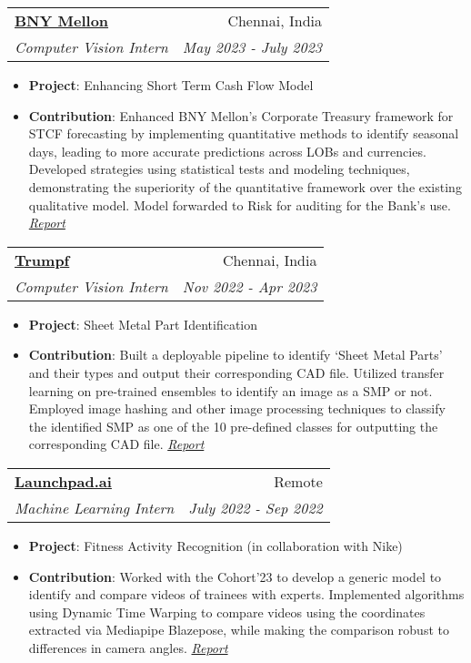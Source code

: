 \documentclass[a4paper,20pt]{article}
\makeatletter
\newcommand{\resumeItem}[2]{
  \item\small{
    \textbf{#1}{: #2 \vspace{-2pt}}
  }
}
\newcommand{\resumeSubheading}[4]{
  \vspace{-1pt}\item
    \begin{tabular*}{0.97\textwidth}{l@{\extracolsep{\fill}}r}
      \textbf{#1} & #2 \\
      \textit{#3} & \textit{#4} \\
    \end{tabular*}\vspace{-5pt}
}
\newcommand{\resumeItemListStart}{\begin{itemize}}
\newcommand{\resumeItemListEnd}{\end{itemize}\vspace{-5pt}}
\makeatother
\begin{document}
\begin{comment}
    \resumeSubheading{Google Summer of Code - Submitty}{Remote}
    {Student Developer (Full-time)}{May 2019 - Sep 2019}
    \resumeItemListStart
        \resumeItem{Discussion Forum Upgrades}
          {Refactor forum for performance to handle large databases.}
          \resumeItem{REST API for Discussion Forum}
          {Symphony \& Twig based Forum parts converted to API-first interface.}
          \resumeItem{Ratchet PHP WebSocket}{Implemented a WebSocket for low-latency real time exchange of posts and thread updates.}
      \resumeItemListEnd
\end{comment}

    \resumeSubheading{\href{https://www.bnymellon.com/}{BNY Mellon}}{Chennai, India}
    {Computer Vision Intern}{May 2023 - July 2023}
    \resumeItemListStart
        \resumeItem{Project}
          {Enhancing Short Term Cash Flow Model}
        \resumeItem{Contribution}
          {Enhanced BNY Mellon's Corporate Treasury framework for STCF forecasting by implementing quantitative methods to identify seasonal days, leading to more accurate predictions across LOBs and currencies. Developed strategies using statistical tests and modeling techniques, demonstrating the superiority of the quantitative framework over the existing qualitative model. Model forwarded to Risk for auditing for the Bank's use. \textit{\href{https://github.com/sampadk04/Internship_Reports/blob/main/BNY_Mellon/Enhancing_Short_Term_Cashflow-Internship_Report.pdf}{Report}}}
      \resumeItemListEnd

    \resumeSubheading{\href{https://www.trumpf.com/en_IN/}{Trumpf}}{Chennai, India}
    {Computer Vision Intern}{Nov 2022 - Apr 2023}
    \resumeItemListStart
        \resumeItem{Project}
          {Sheet Metal Part Identification}
        \resumeItem{Contribution}
          {Built a deployable pipeline to identify ‘Sheet Metal Parts’ and their types and output their corresponding CAD file. Utilized transfer learning on pre-trained ensembles to identify an image as a SMP or not. Employed image hashing and other image processing techniques to classify the identified SMP as one of the 10 pre-defined classes for outputting the corresponding CAD file. \textit{\href{https://github.com/sampadk04/Internship_Reports/blob/main/Trumpf_Metamation/Sheet_Metal_Part_Recognition-Internship_Report.pdf}{Report}}}
      \resumeItemListEnd

    \resumeSubheading{\href{https://www.launchpad.ai}{Launchpad.ai}}{Remote}
    {Machine Learning Intern}{July 2022 - Sep 2022}
    \resumeItemListStart
        \resumeItem{Project}
          {Fitness Activity Recognition (in collaboration with Nike)}
        \resumeItem{Contribution}
          {Worked with the Cohort’23 to develop a generic model to identify and compare videos of trainees with experts. Implemented algorithms using Dynamic Time Warping to compare videos using the coordinates extracted via Mediapipe Blazepose, while making the comparison robust to differences in camera angles. \textit{\href{https://github.com/sampadk04/Internship_Reports/blob/main/Launchpad/Fitness_Activity_Recognition-Final_Report.pdf}{Report}}}
      \resumeItemListEnd
    
\end{document}
